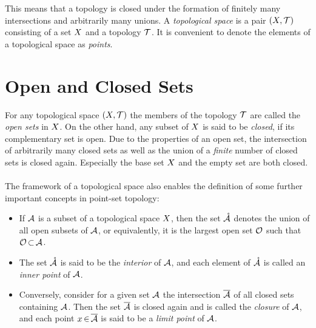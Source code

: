 \documentclass[11pt,twoside]{article}
\begin{document}
This means
that a topology is closed under the formation of finitely
many intersections and arbitrarily many unions.
A \textit{topological space} is a pair $(X,\mathcal{T})$
consisting of a set $X$ and a topology $\mathcal{T}$.
It is convenient to denote the elements of a topological space
as \textit{points}.

\section{Open and Closed Sets}                                                 %
For any topological space $(X,\mathcal{T})$
the members of the topology $\mathcal{T}$ are called
the \textit{open sets} in $X$.
On the other hand,
any subset of $X$ is said to be \textit{closed},
if its complementary set is open.
Due to the properties of an open set,
the intersection of arbitrarily many closed sets as well as
the union of a \textit{finite} number of closed sets is closed again.
Especially the base set $X$ and the empty set are both closed.

\paragraph{}
The framework of a topological space also enables the definition
of some further important concepts in point-set topology:

\begin{itemize}[leftmargin=15pt,itemsep=1pt]
\item[(a)]
If $\mathcal{A}$ is a subset of a topological space $X$,
then the set $\mathring{\mathcal{A}}$ denotes the union
of all open subsets of $\mathcal{A}$,
or equivalently,
it is the largest open set $\mathcal{O}$
such that $\mathcal{O} {\,\subset\,} \mathcal{A}$.

\item[(b)]
The set $\mathring{\mathcal{A}}$ is said to be the \textit{interior} of $\mathcal{A}$,
and each element of $\mathring{\mathcal{A}}$ is called an \textit{inner point}
of $\mathcal{A}$.

\item[(c)]
Conversely,
consider for a given set $\mathcal{A}$ the intersection $\overline{\mathcal{A}}$
of all closed sets containing $\mathcal{A}$.
Then the set $\overline{\mathcal{A}}$ is closed again and is called
the \textit{closure} of $\mathcal{A}$,
and each point $x {\,\in\,} \overline{\mathcal{A}}$ is said to be a \textit{limit point}
of $\mathcal{A}$.
\end{itemize}
\end{document}
